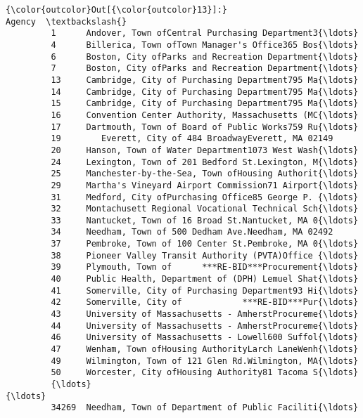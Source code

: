 \documentclass[11pt]{article}
\begin{document}
\begin{Verbatim}[commandchars=\\\{\}]
{\color{outcolor}Out[{\color{outcolor}13}]:}                                                   Agency  \textbackslash{}
         1      Andover, Town ofCentral Purchasing Department3{\ldots}   
         4      Billerica, Town ofTown Manager's Office365 Bos{\ldots}   
         6      Boston, City ofParks and Recreation Department{\ldots}   
         7      Boston, City ofParks and Recreation Department{\ldots}   
         13     Cambridge, City of Purchasing Department795 Ma{\ldots}   
         14     Cambridge, City of Purchasing Department795 Ma{\ldots}   
         15     Cambridge, City of Purchasing Department795 Ma{\ldots}   
         16     Convention Center Authority, Massachusetts (MC{\ldots}   
         17     Dartmouth, Town of Board of Public Works759 Ru{\ldots}   
         19        Everett, City of 484 BroadwayEverett, MA 02149   
         20     Hanson, Town of Water Department1073 West Wash{\ldots}   
         24     Lexington, Town of 201 Bedford St.Lexington, M{\ldots}   
         25     Manchester-by-the-Sea, Town ofHousing Authorit{\ldots}   
         29     Martha's Vineyard Airport Commission71 Airport{\ldots}   
         31     Medford, City ofPurchasing Office85 George P. {\ldots}   
         32     Montachusett Regional Vocational Technical Sch{\ldots}   
         33     Nantucket, Town of 16 Broad St.Nantucket, MA 0{\ldots}   
         34     Needham, Town of 500 Dedham Ave.Needham, MA 02492   
         37     Pembroke, Town of 100 Center St.Pembroke, MA 0{\ldots}   
         38     Pioneer Valley Transit Authority (PVTA)Office {\ldots}   
         39     Plymouth, Town of      ***RE-BID***Procurement{\ldots}   
         40     Public Health, Department of (DPH) Lemuel Shat{\ldots}   
         41     Somerville, City of Purchasing Department93 Hi{\ldots}   
         42     Somerville, City of            ***RE-BID***Pur{\ldots}   
         43     University of Massachusetts - AmherstProcureme{\ldots}   
         44     University of Massachusetts - AmherstProcureme{\ldots}   
         46     University of Massachusetts - Lowell600 Suffol{\ldots}   
         47     Wenham, Town ofHousing AuthorityLarch LaneWenh{\ldots}   
         49     Wilmington, Town of 121 Glen Rd.Wilmington, MA{\ldots}   
         50     Worcester, City ofHousing Authority81 Tacoma S{\ldots}   
         {\ldots}                                                  {\ldots}   
         34269  Needham, Town of Department of Public Faciliti{\ldots}   

\end{Verbatim}
\end{document}
